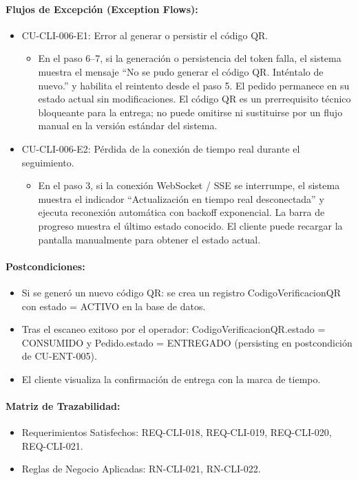 \paragraph{Flujos de Excepción (Exception Flows):}
\begin{itemize}
    \item CU-CLI-006-E1: Error al generar o persistir el código QR.
    \begin{itemize}
        \item En el paso 6--7, si la generación o persistencia del token falla, el sistema muestra el mensaje ``No se pudo generar el código QR. Inténtalo de nuevo.'' y habilita el reintento desde el paso 5. El pedido permanece en su estado actual sin modificaciones. El código QR es un prerrequisito técnico bloqueante para la entrega; no puede omitirse ni sustituirse por un flujo manual en la versión estándar del sistema.
    \end{itemize}
    \item CU-CLI-006-E2: Pérdida de la conexión de tiempo real durante el seguimiento.
    \begin{itemize}
        \item En el paso 3, si la conexión WebSocket / SSE se interrumpe, el sistema muestra el indicador ``Actualización en tiempo real desconectada'' y ejecuta reconexión automática con backoff exponencial. La barra de progreso muestra el último estado conocido. El cliente puede recargar la pantalla manualmente para obtener el estado actual.
    \end{itemize}
\end{itemize}

\paragraph{Postcondiciones:}
\begin{itemize}
    \item Si se generó un nuevo código QR: se crea un registro CodigoVerificacionQR con estado = ACTIVO en la base de datos.
    \item Tras el escaneo exitoso por el operador: CodigoVerificacionQR.estado = CONSUMIDO y Pedido.estado = ENTREGADO (persisting en postcondición de CU-ENT-005).
    \item El cliente visualiza la confirmación de entrega con la marca de tiempo.
\end{itemize}

\paragraph{Matriz de Trazabilidad:}
\begin{itemize}
    \item Requerimientos Satisfechos: REQ-CLI-018, REQ-CLI-019, REQ-CLI-020, REQ-CLI-021.
    \item Reglas de Negocio Aplicadas: RN-CLI-021, RN-CLI-022.
\end{itemize}

